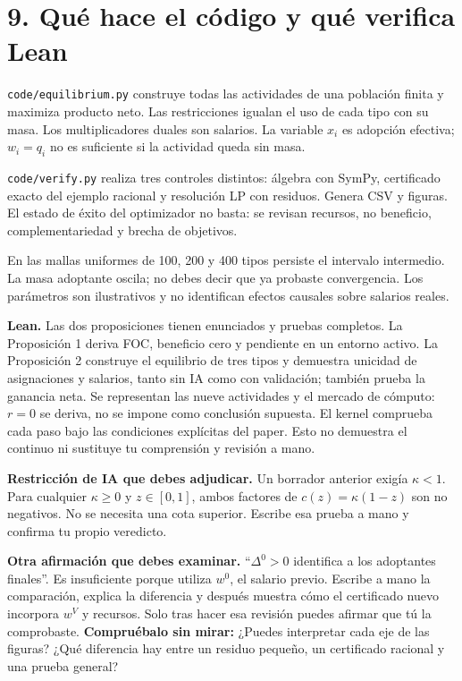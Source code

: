 \documentclass[11pt]{article}
\newcommand{\pregunta}[1]{\medskip\textbf{Compruébalo sin mirar:} #1\par}
\begin{document}
\section*{9. Qué hace el código y qué verifica Lean}
\texttt{code/equilibrium.py} construye todas las actividades de una población finita y maximiza producto neto. Las restricciones igualan el uso de cada tipo con su masa. Los multiplicadores duales son salarios. La variable $x_i$ es adopción efectiva; $w_i=q_i$ no es suficiente si la actividad queda sin masa.

\texttt{code/verify.py} realiza tres controles distintos: álgebra con SymPy, certificado exacto del ejemplo racional y resolución LP con residuos. Genera CSV y figuras. El estado de éxito del optimizador no basta: se revisan recursos, no beneficio, complementariedad y brecha de objetivos.

En las mallas uniformes de 100, 200 y 400 tipos persiste el intervalo intermedio. La masa adoptante oscila; no debes decir que ya probaste convergencia. Los parámetros son ilustrativos y no identifican efectos causales sobre salarios reales.

\textbf{Lean.} Las dos proposiciones tienen enunciados y pruebas completos. La Proposición 1 deriva FOC, beneficio cero y pendiente en un entorno activo. La Proposición 2 construye el equilibrio de tres tipos y demuestra unicidad de asignaciones y salarios, tanto sin IA como con validación; también prueba la ganancia neta. Se representan las nueve actividades y el mercado de cómputo: $r=0$ se deriva, no se impone como conclusión supuesta. El kernel comprueba cada paso bajo las condiciones explícitas del paper. Esto no demuestra el continuo ni sustituye tu comprensión y revisión a mano.

\textbf{Restricción de IA que debes adjudicar.} Un borrador anterior exigía $\kappa<1$. Para cualquier $\kappa\geq0$ y $z\in[0,1]$, ambos factores de $c(z)=\kappa(1-z)$ son no negativos. No se necesita una cota superior. Escribe esa prueba a mano y confirma tu propio veredicto.\par\medskip\textbf{Otra afirmación que debes examinar.} ``$\Delta^0>0$ identifica a los adoptantes finales''. Es insuficiente porque utiliza $w^0$, el salario previo. Escribe a mano la comparación, explica la diferencia y después muestra cómo el certificado nuevo incorpora $w^V$ y recursos. Solo tras hacer esa revisión puedes afirmar que tú la comprobaste.
\pregunta{¿Puedes interpretar cada eje de las figuras? ¿Qué diferencia hay entre un residuo pequeño, un certificado racional y una prueba general?}
\newpage
\end{document}
